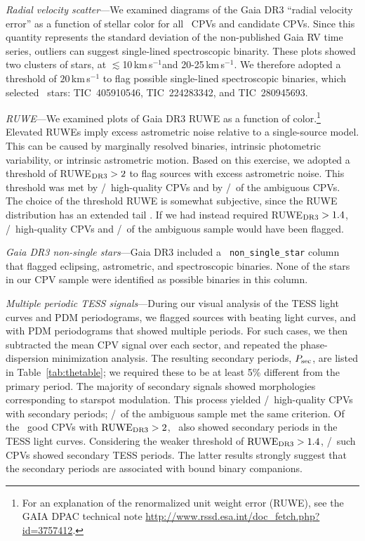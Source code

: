 \documentclass[11pt,twocolumn,tighten,linenumbers]{aastex63}
\newcommand{\kms}{{km\,s$^{-1}$}}
\begin{document}
{\it Radial velocity scatter}---We examined diagrams of the Gaia DR3
``radial velocity error'' as a function of stellar color for all
\ncqvsnodebunked\ CPVs and candidate CPVs.  Since this quantity
represents the standard deviation of the non-published Gaia RV time
series, outliers can suggest single-lined spectroscopic binarity.
These plots showed two clusters of stars, at $\lesssim$10\,\kms and
20-25\,\kms.  We therefore adopted a threshold of $20$\,km\,s$^{-1}$
to flag possible single-lined spectroscopic binaries, which selected
\nrvscatterflag\ stars: TIC~405910546, TIC~224283342, and
TIC~280945693.

{\it RUWE}---We examined plots of Gaia DR3 RUWE as a function of
color.\footnote{For an explanation of the renormalized unit weight
error (RUWE), see the GAIA DPAC technical note
\url{http://www.rssd.esa.int/doc_fetch.php?  id=3757412}.}  Elevated
RUWEs imply excess astrometric noise relative to a single-source
model.  This can be caused by marginally resolved binaries,  intrinsic
photometric variability, or intrinsic astrometric motion.  Based on
this exercise, we adopted a threshold of RUWE$_{\rm DR3}>2$ to flag
sources with excess astrometric noise.  This threshold was met by
\ngoodhighruwe/\ngoods\ high-quality CPVs and by
\nmaybehighruwe/\nmaybes\ of the ambiguous CPVs.  The choice of the
threshold RUWE is somewhat subjective, since the RUWE distribution has
an extended tail \citep[e.g.][]{2022MNRAS.513.5270P}.  If we had
instead required RUWE$_{\rm DR3}>1.4$, \ngoodweakruwe/\ngoods\
high-quality CPVs and \nmaybeweakruwe/\nmaybes\ of the ambiguous
sample would have been flagged.

{\it Gaia DR3 non-single stars}---Gaia DR3 included a {\tt
non\_single\_star} column that flagged eclipsing, astrometric, and
spectroscopic binaries.  None of the stars in our CPV sample were
identified as possible binaries in this column.

{\it Multiple periodic TESS signals}---During our visual analysis of
the TESS light curves and PDM periodograms, we flagged sources with
beating light curves, and with PDM periodograms that showed multiple
periods.  For such cases, we then subtracted the mean CPV signal over
each sector, and repeated the phase-dispersion minimization analysis.
The resulting secondary periods, $P_{\rm sec}$, are listed in
Table~\ref{tab:thetable}; we required these to be at least 5\%
different from the primary period.  The majority of secondary signals
showed morphologies corresponding to starspot modulation.  This
process yielded \ngoodmultperiodflag/\ngoods\ high-quality CPVs with
secondary periods; \nmaybemultperiodflag/\nmaybes\ of the ambiguous
sample met the same criterion.  Of the \ngoodhighruwe\ good CPVs with
${\rm RUWE}_{\rm DR3}> 2$, \ngoodruweandmultperiod\ also showed
secondary periods in the TESS light curves.  Considering the weaker
threshold of ${\rm RUWE}_{\rm DR3}> 1.4$,
\ngoodweakruweandmultperiod/\ngoodweakruwe\ such CPVs showed secondary
TESS periods.  The latter results strongly suggest that the secondary
periods are associated with bound binary companions.
\end{document}
